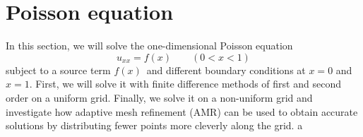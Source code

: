 \section{Poisson equation}

In this section, we will solve the one-dimensional Poisson equation
\begin{equation*}
u_{xx} = f(x) \qquad (0 < x < 1)
\end{equation*}
subject to a source term $f(x)$ and different boundary conditions at $x = 0$ and $x = 1$.
First, we will solve it with finite difference methods of first and second order on a uniform grid.
Finally, we solve it on a non-uniform grid and investigate how adaptive mesh refinement (AMR) can be used to obtain accurate solutions by distributing fewer points more cleverly along the grid.
a

